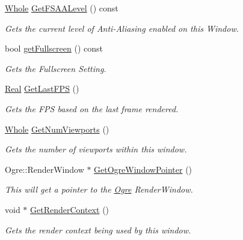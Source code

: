 \begin{DoxyCompactItemize}
\hyperlink{namespaceMezzanine_adcbb6ce6d1eb4379d109e51171e2e493}{Whole} \hyperlink{classMezzanine_1_1GameWindow_a221263d2fe846eeaefe18b6817642dd8}{GetFSAALevel} () const 
\begin{DoxyCompactList}\small\item\em Gets the current level of Anti-\/Aliasing enabled on this Window. \item\end{DoxyCompactList}\item 
bool \hyperlink{classMezzanine_1_1GameWindow_a44e2caa0a6300c5365deb287c79c0153}{getFullscreen} () const 
\begin{DoxyCompactList}\small\item\em Gets the Fullscreen Setting. \item\end{DoxyCompactList}\item 
\hyperlink{namespaceMezzanine_a726731b1a7df72bf3583e4a97282c6f6}{Real} \hyperlink{classMezzanine_1_1GameWindow_af298623981d66effc33760484c6b11d7}{GetLastFPS} ()
\begin{DoxyCompactList}\small\item\em Gets the FPS based on the last frame rendered. \item\end{DoxyCompactList}\item 
\hyperlink{namespaceMezzanine_adcbb6ce6d1eb4379d109e51171e2e493}{Whole} \hyperlink{classMezzanine_1_1GameWindow_a69e900fe0f1cb85cd1723991ebf808c5}{GetNumViewports} ()
\begin{DoxyCompactList}\small\item\em Gets the number of viewports within this window. \item\end{DoxyCompactList}\item 
Ogre::RenderWindow $\ast$ \hyperlink{classMezzanine_1_1GameWindow_aade1ad28994653f9a8bca94d0c30cd5c}{GetOgreWindowPointer} ()
\begin{DoxyCompactList}\small\item\em This will get a pointer to the \hyperlink{namespaceOgre}{Ogre} RenderWindow. \item\end{DoxyCompactList}\item 
void $\ast$ \hyperlink{classMezzanine_1_1GameWindow_afa4d53d324199329435946b652f27950}{GetRenderContext} ()
\begin{DoxyCompactList}\small\item\em Gets the render context being used by this window. \item\end{DoxyCompactList}\item 

\end{DoxyCompactItemize}
